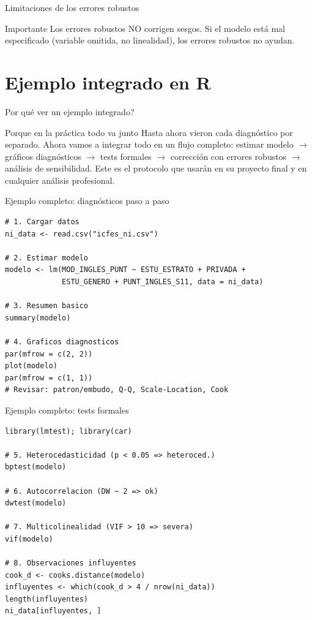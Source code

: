 \documentclass[aspectratio=169, 11pt]{beamer}
\begin{document}
\begin{frame}{Limitaciones de los errores robustos}
\begin{alertblock}{Importante}
Los errores robustos NO corrigen sesgos. Si el modelo está mal especificado (variable omitida, no linealidad), los errores robustos no ayudan.
\end{alertblock}
\end{frame}

\section{Ejemplo integrado en R}

\begin{frame}{\textquestiondown{}Por qu\'e ver un ejemplo integrado?}
\begin{exampleblock}{Porque en la pr\'actica todo va junto}
\small
Hasta ahora vieron cada diagn\'ostico por separado. Ahora vamos a integrar todo en un flujo completo: estimar modelo $\to$ gr\'aficos diagn\'osticos $\to$ tests formales $\to$ correcci\'on con errores robustos $\to$ an\'alisis de sensibilidad. Este es el protocolo que usar\'an en su proyecto final y en cualquier an\'alisis profesional.
\end{exampleblock}
\end{frame}

\begin{frame}[fragile]{Ejemplo completo: diagnósticos paso a paso}
\small
\begin{lstlisting}
# 1. Cargar datos
ni_data <- read.csv("icfes_ni.csv")

# 2. Estimar modelo
modelo <- lm(MOD_INGLES_PUNT ~ ESTU_ESTRATO + PRIVADA +
             ESTU_GENERO + PUNT_INGLES_S11, data = ni_data)

# 3. Resumen basico
summary(modelo)

# 4. Graficos diagnosticos
par(mfrow = c(2, 2))
plot(modelo)
par(mfrow = c(1, 1))
# Revisar: patron/embudo, Q-Q, Scale-Location, Cook
\end{lstlisting}
\end{frame}

\begin{frame}[fragile]{Ejemplo completo: tests formales}
\small
\begin{lstlisting}
library(lmtest); library(car)

# 5. Heterocedasticidad (p < 0.05 => heteroced.)
bptest(modelo)

# 6. Autocorrelacion (DW ~ 2 => ok)
dwtest(modelo)

# 7. Multicolinealidad (VIF > 10 => severa)
vif(modelo)

# 8. Observaciones influyentes
cook_d <- cooks.distance(modelo)
influyentes <- which(cook_d > 4 / nrow(ni_data))
length(influyentes)
ni_data[influyentes, ]
\end{lstlisting}
\end{frame}
\end{document}
